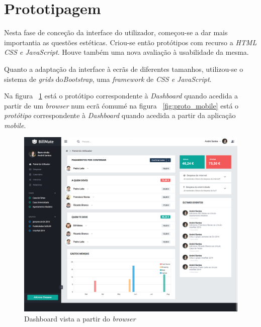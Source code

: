 \section{Prototipagem}

Nesta fase de conceção da interface do utilizador, começou-se a dar mais importantia as questões estéticas. Criou-se então protótipos com recurso a \emph{HTML CSS e JavaScript}. Houve também uma nova avaliação à usabilidade da mesma.

Quanto a adaptação da interface à ecrãs de diferentes tamanhos, utilizou-se o sistema de \emph{grids} do\emph{Bootstrap}, uma \emph{framework} de \emph{CSS e JavaScript}.

Na figura ~\ref{fig:proto_dash} está o protótipo correspondente à \emph{Dashboard} quando acedida a partir de um \emph{browser} num ecrã \'comum\' e na figura ~\ref{fig:proto_mobile} está o \emph{protótipo} correspondente à \emph{Dashboard} quando acedida a partir da aplicação \emph{mobile}.

\begin{figure}[H]
\centering
\includegraphics[width=.9\textwidth]{images/dashboardprot}
\caption{Dashboard vista a partir do \emph{browser}}
\label{fig:proto_dash}
\end{figure}


